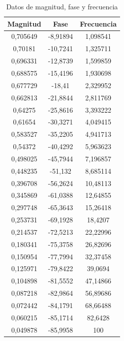 \documentclass[
  11pt,
  letterpaper,
   addpoints,
   answers
  ]{exam}
\begin{document}
\begin{questions}
    \begin{table}[H]
        \centering
        \footnotesize
        \begin{tabular}{|c|c|c|}
        \hline
        \textbf{Magnitud} & \textbf{Fase} & \textbf{Frecuencia} \\
        \hline
        0,705649 & -8,91894 & 1,098541 \\
        0,70181 & -10,7241 & 1,325711 \\
        0,696331 & -12,8739 & 1,599859 \\
        0,688575 & -15,4196 & 1,930698 \\
        0,677729 & -18,41 & 2,329952 \\
        0,662813 & -21,8844 & 2,811769 \\
        0,64275 & -25,8616 & 3,393222 \\
        0,61654 & -30,3271 & 4,049415 \\
        0,583527 & -35,2205 & 4,941713 \\
        0,54372 & -40,4292 & 5,963623 \\
        0,498025 & -45,7944 & 7,196857 \\
        0,448235 & -51,132 & 8,685114 \\
        0,396708 & -56,2624 & 10,48113 \\
        0,345869 & -61,0388 & 12,64855 \\
        0,297748 & -65,3643 & 15,26418 \\
        0,253731 & -69,1928 & 18,4207 \\
        0,214537 & -72,5213 & 22,22996 \\
        0,180341 & -75,3758 & 26,82696 \\
        0,150954 & -77,7994 & 32,37458 \\
        0,125971 & -79,8422 & 39,0694 \\
        0,104898 & -81,5552 & 47,14866 \\
        0,087218 & -82,9864 & 56,89686 \\
        0,072442 & -84,1791 & 68,66488 \\
        0,060215 & -85,1714 & 82,6428 \\
        0,049878 & -85,9958 & 100 \\
        \hline
        \end{tabular}
        \caption{Datos de magnitud, fase y frecuencia}
    \end{table}
    
    
    

\end{questions}
\end{document}
